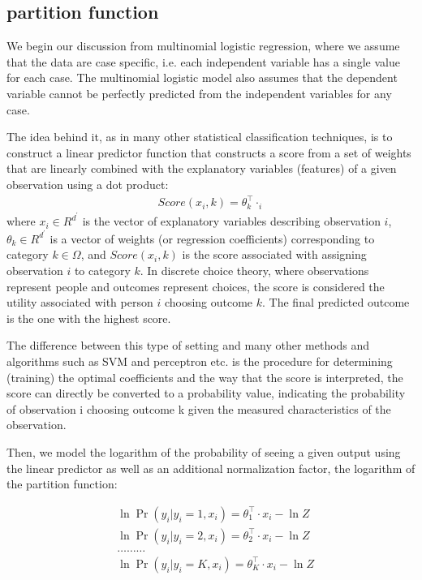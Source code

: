 \documentclass{article}
\begin{document}
\subsection{partition function}

We begin our discussion from multinomial logistic regression, where we assume that the data are case specific, i.e. each independent variable has a single value for each case. 
The multinomial logistic model also assumes that the dependent variable cannot be perfectly predicted from the independent variables for any case.

The idea behind it, as in many other statistical classification techniques, is to construct a linear predictor function that constructs a score from a set of weights that
 are linearly combined with the explanatory variables (features) of a given observation using a dot product:
 \begin{equation}
  \begin{aligned}
   Score(x_i, k) = \theta_{k}^{\top } \cdot _i  \nonumber
  \end{aligned}
 \end{equation}
 where $x_i \in R^{d^{\prime}}$ is the vector of explanatory variables describing observation $i$, $\theta_k \in R^{d^{\prime}}$ is a vector of weights (or regression coefficients) corresponding to category $k \in \Omega$, and $Score(x_i, k)$
  is the score associated with assigning observation $i$ to category $k$. In discrete choice theory, where observations represent people and outcomes represent choices, the score is considered 
  the utility associated with person $i$ choosing outcome $k$. 
 The final predicted outcome is the one with the highest score.

 The difference between this type of setting and many other methods and algorithms such as SVM and perceptron etc. is the procedure for determining (training) the optimal coefficients
  and the way that the score is interpreted, the score can directly be converted to a probability value, indicating the probability of observation i choosing outcome k given the measured
   characteristics of the observation. 

   Then, we model the logarithm of the probability of seeing 
   a given output using the linear predictor as well as an additional normalization factor, the logarithm of the partition function:
   
    \begin{equation}
      \begin{aligned}
       &\ln \Pr(y_i | y_i = 1, x_i) = \theta_{1}^{\top } \cdot x_i - \ln Z  \nonumber \\
       &\ln \Pr(y_i | y_i = 2, x_i) = \theta_{2}^{\top } \cdot x_i - \ln Z  \nonumber \\
       &\ldots \ldots \ldots  \\ 
       &\ln \Pr(y_i | y_i = K, x_i) = \theta_{K}^{\top } \cdot x_i - \ln Z  \nonumber \\
      \end{aligned}
     \end{equation}
  
\end{document}
